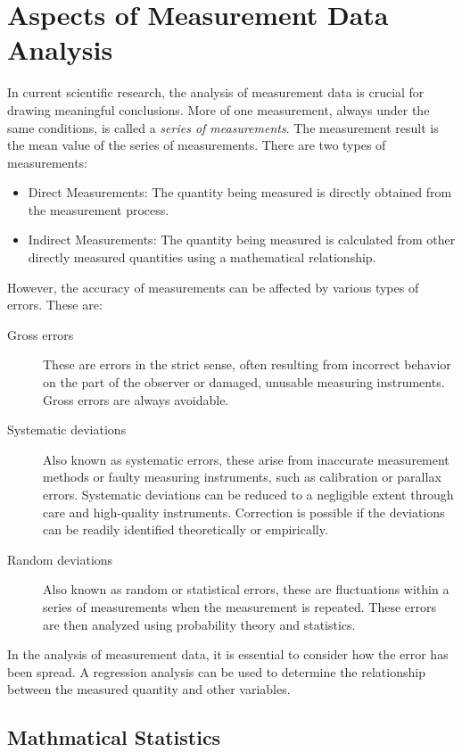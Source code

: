 \chapter{Aspects of Measurement Data Analysis}

In current scientific research, the analysis of measurement data is crucial for drawing meaningful conclusions. More of one measurement, always under the same conditions, is called a \textit{series of measurements}. The measurement result is the mean value of the series of measurements. There are two types of measurements:
\begin{itemize}
    \item Direct Measurements: The quantity being measured is directly obtained from the measurement process.
    \item Indirect Measurements: The quantity being measured is calculated from other directly measured quantities using a mathematical relationship.
\end{itemize}

However, the accuracy of measurements can be affected by various types of errors. These are:
\begin{description}
    \item[Gross errors] These are errors in the strict sense, often resulting from incorrect behavior on the part of the observer or damaged, unusable measuring instruments. Gross errors are always avoidable.
    \item[Systematic deviations] Also known as systematic errors, these arise from inaccurate measurement methods or faulty measuring instruments, such as calibration or parallax errors. Systematic deviations can be reduced to a negligible extent through care and high-quality instruments. Correction is possible if the deviations can be readily identified theoretically or empirically.
    \item[Random deviations] Also known as random or statistical errors, these are fluctuations within a series of measurements when the measurement is repeated. These errors are then analyzed using probability theory and statistics.
\end{description}

In the analysis of measurement data, it is essential to consider how the error has been spread. A regression analysis can be used to determine the relationship between the measured quantity and other variables.

\section{Mathmatical Statistics}


